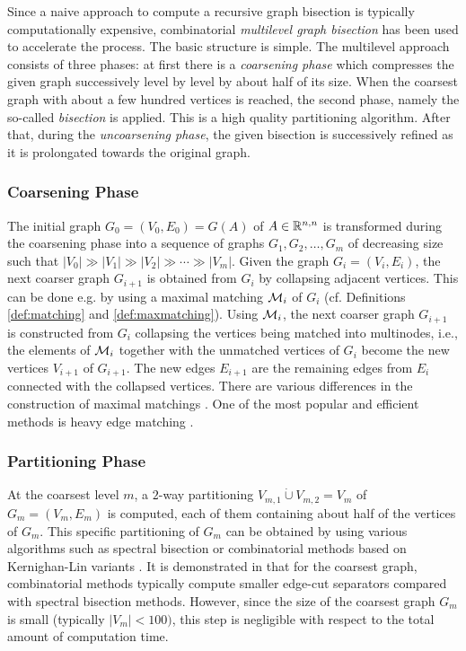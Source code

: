 Since a naive approach to compute a recursive graph bisection is 
typically computationally expensive,
combinatorial \emph{multilevel graph bisection} has been used to
accelerate the process. The basic structure is simple. The multilevel approach
consists of three phases: at first there is a \emph{coarsening phase}
which compresses the given graph successively
level by level by about half of its size. When the coarsest graph with about
a few hundred vertices is reached, the second phase,  namely the so-called
\emph{bisection} is applied. This is a high quality partitioning algorithm.
After that, during the \emph{uncoarsening phase}, the given
bisection is successively refined as it is prolongated towards the original
graph. 

\subsubsection*{Coarsening Phase}
The initial graph $G_0=(V_0,E_0)=G(A)$ of $A\in\mathbb{R}^{n,n}$ is transformed during
the coarsening phase
into a sequence of graphs $G_1, G_2, \ldots, G_m$ of decreasing size 
such that $|V_0|\gg|V_1|\gg|V_2|\gg\cdots\gg|V_m|$. 
Given the graph $G_i=(V_i,E_i)$, the
next coarser graph $G_{i+1}$ is  obtained from $G_i$ by collapsing adjacent
vertices. This can be done e.g. by using a maximal matching $\mathcal{M}_i$ of $G_i$ (cf. Definitions \ref{def:matching} and \ref{def:maxmatching}).
Using $\mathcal{M}_i$, the next  coarser graph $G_{i+1}$ is 
constructed from $G_i$ collapsing the vertices 
being matched into multinodes, i.e., the elements of  $\mathcal{M}_i$ together with the
unmatched vertices of $G_i$ become the new vertices $V_{i+1}$ of $G_{i+1}$. 
The new edges $E_{i+1}$ are the remaining edges from $E_i$ 
connected with the collapsed vertices. 
There are various differences in the construction of maximal matchings
\cite{karypis:98,CheP08}. 
One of the most popular and efficient methods is heavy edge
matching \cite{karypis:98}.

\subsubsection*{Partitioning Phase}
At the coarsest level $m$,
a $2$-way partitioning $V_{m,1}\dot{\cup}V_{m,2}=V_m$ of $G_m=(V_m,E_m)$ is computed,
each of them containing about half of the vertices of $G_m$.
This specific partitioning of $G_m$ can be obtained by using various
algorithms such as spectral bisection \cite{fiedler:75} or
combinatorial methods based on Kernighan-Lin variants
\cite{KerL70,FidM97}. It is demonstrated in \cite{karypis:98} that 
for the coarsest graph, combinatorial
methods typically compute smaller edge-cut separators compared with
spectral bisection methods. However, since
the size of the coarsest graph $G_m$ is small (typically $|V_m|<100)$, this
step is negligible with respect to the total amount of computation time.

